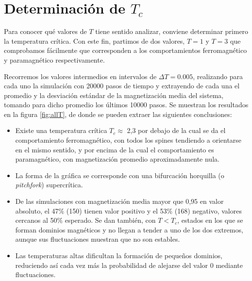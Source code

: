 \documentclass{scrartcl}
\begin{document}
\section{Determinación de $T_c$}
Para conocer qué valores de $T$ tiene sentido analizar, conviene determinar primero la temperatura crítica. Con este fin, partimos de dos valores, $T=1$ y $T=3$ que comprobamos fácilmente que corresponden a los comportamientos ferromagnético y paramagnético respectivamente.\par
Recorremos los valores intermedios en intervalos de $\Delta T = 0.005$, realizando para cada uno la simulación con 20000 pasos de tiempo y extrayendo de cada una el promedio y la desviación estándar de la magnetización media del sistema, tomando para dicho promedio los últimos 10000 pasos. Se muestran los resultados en la figura \ref{fig:allT}, de donde se pueden extraer las siguientes conclusiones:\par
\begin{itemize}
\item Existe una temperatura crítica $T_c \approx$ 2,3 por debajo de la cual se da el comportamiento ferromagnético, con todos los spines tendiendo a orientarse en el mismo sentido, y por encima de la cual el comportamiento es paramagnético, con magnetización promedio aproximadamente nula.
\item La forma de la gráfica se corresponde con una bifurcación horquilla (o \textit{pitchfork}) supercrítica.
\item De las simulaciones con magnetización media mayor que 0,95 en valor absoluto, el 47\% (150) tienen valor positivo y el 53\% (168) negativo, valores cercanos al 50\% esperado. Se dan también, con $T<T_c$, estados en los que se forman dominios magnéticos y no llegan a tender a uno de los dos extremos, aunque sus fluctuaciones muestran que no son estables.
\item Las temperaturas altas dificultan la formación de pequeños dominios, reduciendo así cada vez más la probabilidad de alejarse del valor 0 mediante fluctuaciones.
\end{itemize}
\end{document}
